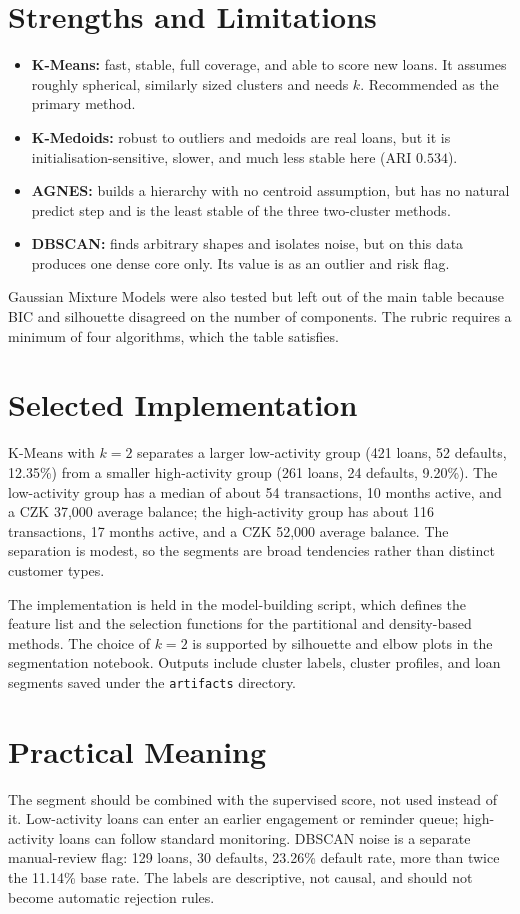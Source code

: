 \section{Strengths and Limitations}
\begin{itemize}
    \item \textbf{K-Means:} fast, stable, full coverage, and able to score new loans. It assumes roughly spherical, similarly sized clusters and needs $k$. Recommended as the primary method.
    \item \textbf{K-Medoids:} robust to outliers and medoids are real loans, but it is initialisation-sensitive, slower, and much less stable here (ARI $0.534$).
    \item \textbf{AGNES:} builds a hierarchy with no centroid assumption, but has no natural predict step and is the least stable of the three two-cluster methods.
    \item \textbf{DBSCAN:} finds arbitrary shapes and isolates noise, but on this data produces one dense core only. Its value is as an outlier and risk flag.
\end{itemize}

Gaussian Mixture Models were also tested but left out of the main table because BIC and silhouette disagreed on the number of components. The rubric requires a minimum of four algorithms, which the table satisfies.

\section{Selected Implementation}
K-Means with $k=2$ separates a larger low-activity group (421 loans, 52 defaults, 12.35\%) from a smaller high-activity group (261 loans, 24 defaults, 9.20\%). The low-activity group has a median of about 54 transactions, 10 months active, and a CZK 37{,}000 average balance; the high-activity group has about 116 transactions, 17 months active, and a CZK 52{,}000 average balance. The separation is modest, so the segments are broad tendencies rather than distinct customer types.

The implementation is held in the model-building script, which defines the feature list and the selection functions for the partitional and density-based methods. The choice of $k=2$ is supported by silhouette and elbow plots in the segmentation notebook. Outputs include cluster labels, cluster profiles, and loan segments saved under the \texttt{artifacts} directory.

\section{Practical Meaning}
The segment should be combined with the supervised score, not used instead of it. Low-activity loans can enter an earlier engagement or reminder queue; high-activity loans can follow standard monitoring. DBSCAN noise is a separate manual-review flag: 129 loans, 30 defaults, 23.26\% default rate, more than twice the 11.14\% base rate. The labels are descriptive, not causal, and should not become automatic rejection rules.

